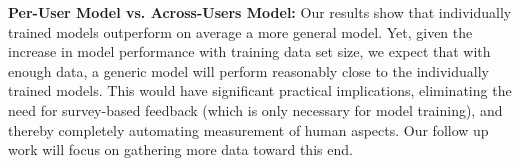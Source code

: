 \vspace{0.05in}
\noindent
\textbf{Per-User Model vs. Across-Users Model:}
Our results show that individually trained models outperform on average a more general model. Yet, given the increase in model performance with training data set size, we expect that with enough data, a generic model will perform reasonably close to the individually trained models. This would have significant practical implications, eliminating the need for survey-based feedback (which is only necessary for model training), and thereby completely automating measurement of human aspects. Our follow up work will focus on gathering more data toward this end.




